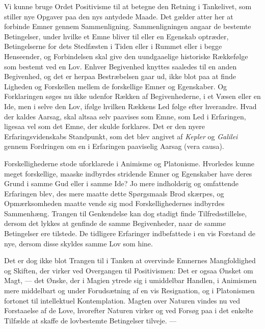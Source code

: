 \documentclass[12pt,a4paper]{book}
\newcommand{\opage}[1]{\marginnote{\footnotesize\textit{[#1]}}}
\begin{document}
Vi kunne bruge Ordet Positivisme til at betegne den Retning i
Tankelivet, som stiller nye Opgaver paa den nys antydede Maade. Det
gælder atter her at forbinde Emner gennem Sammenligning. Sammenligningen
angaar de bestemte
\opage{122}Betingelser, under hvilke et Emne bliver til eller en
Egenskab optræder, Betingelserne for dets Stedfæsten i Tiden eller i
Rummet eller i begge Henseender, og Forbindelsen skal give den
uundgaaelige historiske Rækkefølge som bestemt ved en Lov. Enhver
Begivenhed knyttes saaledes til en anden Begivenhed, og det er herpaa
Bestræbelsen gaar ud, ikke blot paa at finde Ligheden og Forskellen
mellem de forskellige Emner og Egenskaber. Og Forklaringen søges nu ikke
udenfor Rækken af Begivenhederne, i et Væsen eller en Ide, men i selve
den Lov, ifølge hvilken Rækkens Led følge efter hverandre. Hvad der
kaldes Aarsag, skal altsaa selv paavises som Emne, som Led i Erfaringen,
ligesaa vel som det Emne, der skulde forklares. Det er den nyere
Erfaringsvidenskabs Standpunkt, som det blev angivet af \emph{Kepler} og
\emph{Galilei} gennem Fordringen om en i Erfaringen paaviselig Aarsag
(vera causa).

Forskellighederne stode uforklarede i Animisme og Platonisme. Hvorledes
kunne meget forskellige, maaske indbyrdes stridende Emner og Egenskaber
have deres Grund i samme Gud eller i samme Ide? Jo mere indholdsrig og
omfattende Erfaringen blev, des mere maatte dette Spørgsmaals Brod
skærpes, og Opmærksomheden maatte vende sig mod Forskellighedernes
indbyrdes Sammenhæng. Trangen til Genkendelse kan dog stadigt finde
Tilfredsstillelse, dersom det lykkes at genfinde de samme Begivenheder,
naar de samme Betingelser ere tilstede. De tidligere Erfaringer
indbefattede i en vis Forstand de nye, dersom disse skyldes samme Lov som
hine.

Det er dog ikke blot Trangen til i Tanken at overvinde Emnernes
Mangfoldighed og Skiften, der virker ved Overgangen til Positivismen:
Det er ogsaa Ønsket om Magt, --- det Ønske, der i Magien ytrede sig i
umiddelbar Handlen, i Animismen mere middelbart og under Forudsætning af
en vis Resignation, og i Platonismen fortonet til intellektuel
Kontemplation. Magten over Naturen vindes nu ved Forstaaelse af de Love,
hvorefter Naturen virker og ved Forsøg paa i det enkelte Tilfælde at
skaffe de lovbestemte Betingelser tilveje. ---
\end{document}

